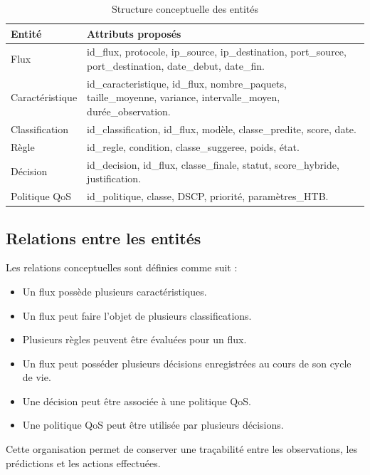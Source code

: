 \begin{table}[H]
\centering
\caption{Structure conceptuelle des entités}
\label{tab:entites_mcd}
\begin{tabularx}{\textwidth}{|l|X|}
\hline
\textbf{Entité} & \textbf{Attributs proposés} \\
\hline
Flux &
id\_flux, protocole, ip\_source, ip\_destination,
port\_source, port\_destination, date\_debut,
date\_fin. \\
\hline
Caractéristique &
id\_caracteristique, id\_flux, nombre\_paquets,
taille\_moyenne, variance, intervalle\_moyen,
durée\_observation. \\
\hline
Classification &
id\_classification, id\_flux, modèle,
classe\_predite, score, date. \\
\hline
Règle &
id\_regle, condition, classe\_suggeree,
poids, état. \\
\hline
Décision &
id\_decision, id\_flux, classe\_finale,
statut, score\_hybride, justification. \\
\hline
Politique QoS &
id\_politique, classe, DSCP, priorité,
paramètres\_HTB. \\
\hline
\end{tabularx}
\end{table}

\subsection{Relations entre les entités}

Les relations conceptuelles sont définies comme suit :

\begin{itemize}
    \item Un flux possède plusieurs caractéristiques.
    \item Un flux peut faire l'objet de plusieurs classifications.
    \item Plusieurs règles peuvent être évaluées pour un flux.
    \item Un flux peut posséder plusieurs décisions
    enregistrées au cours de son cycle de vie.
    \item Une décision peut être associée à une politique QoS.
    \item Une politique QoS peut être utilisée par
    plusieurs décisions.
\end{itemize}

Cette organisation permet de conserver une traçabilité
entre les observations, les prédictions et les actions
effectuées.

